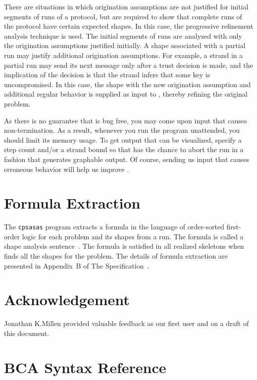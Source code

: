 \documentclass[12pt]{article}
\begin{document}
There are situations in which origination assumptions are not
justified for initial segments of runs of a protocol, but are required
to show that complete runs of the protocol have certain expected
shapes.  In this case, the progressive refinement analysis technique
is used.  The initial segments of runs are analyzed with only the
origination assumptions justified initially.  A shape associated with
a partial run may justify additional origination assumptions.  For
example, a strand in a partial run may send its next message only
after a trust decision is made, and the implication of the decision is
that the strand infers that some key is uncompromised.  In this
case, the shape with the new origination assumption and additional
regular behavior is supplied as input to {\cpsa}, thereby refining the
original problem.

As there is no guarantee that {\cpsa} is bug free, you may come upon
input that causes non-termination.  As a result, whenever you run the
program unattended, you should limit its memory usage.  To get output
that can be visualized, specify a step count and/or a strand bound so
that {\cpsa} has the chance to abort the run in a fashion that
generates graphable output.  Of course, sending us input that causes
erroneous behavior will help us improve {\cpsa}.

\section{Formula Extraction}\label{sec:formulas}

The \texttt{cpsasas} program extracts a formula in the language of
order-sorted first-order logic for each problem and its shapes from a
{\cpsa} run. The formula is called a shape analysis
sentence~\cite{Ramsdell12}. The formula is satisfied in all realized
skeletons when {\cpsa} finds all the shapes for the problem.  The
details of formula extraction are presented in Appendix~B of The
{\cpsa} Specification~\cite{cpsaspec09}.

\section*{Acknowledgement}

Jonathan K.\@ Millen provided valuable feedback as our first {\cpsa}
user and on a draft of this document.

\appendix

\section{BCA Syntax Reference}\label{sec:syntax reference}
\end{document}
